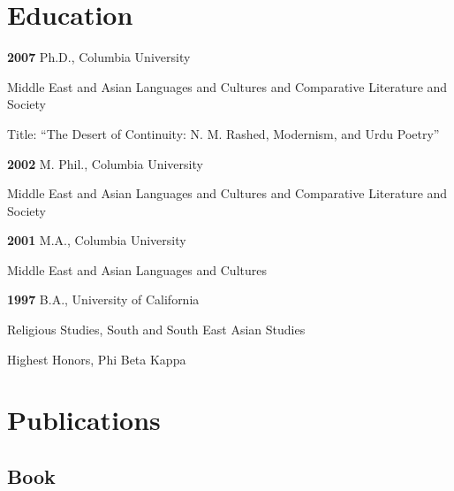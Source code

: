\documentclass[letterpaper,12pt]{article}
\newenvironment{DUlineblock}[1]{%
    \list{}{\setlength{\partopsep}{\parskip}
            \addtolength{\partopsep}{\baselineskip}
            \setlength{\topsep}{0pt}
            \setlength{\itemsep}{0.15\baselineskip}
            \setlength{\parsep}{0pt}
            \setlength{\leftmargin}{#1}}
    \raggedright
  }
  {\endlist}
\begin{document}
\section{Education%
  \label{education}%
}

\begin{DUlineblock}{0em}
\item[] \textbf{2007}
Ph.D., Columbia University
\item[]
\begin{DUlineblock}{\DUlineblockindent}
\item[] Middle East and Asian Languages and Cultures and Comparative Literature and Society
\item[] Title: “The Desert of Continuity: N. M. Rashed, Modernism, and Urdu Poetry”
\end{DUlineblock}
\item[] \textbf{2002}
M. Phil., Columbia University
\item[]
\begin{DUlineblock}{\DUlineblockindent}
\item[] Middle East and Asian Languages and Cultures and Comparative Literature and Society
\end{DUlineblock}
\item[] \textbf{2001}
M.A., Columbia University
\item[]
\begin{DUlineblock}{\DUlineblockindent}
\item[] Middle East and Asian Languages and Cultures
\end{DUlineblock}
\item[] \textbf{1997}
B.A., University of California
\item[]
\begin{DUlineblock}{\DUlineblockindent}
\item[] Religious Studies, South and South East Asian Studies
\item[] Highest Honors, Phi Beta Kappa
\end{DUlineblock}
\end{DUlineblock}


\section{Publications%
  \label{publications}%
}


\subsection{Book%
  \label{book}%
}
\end{document}
